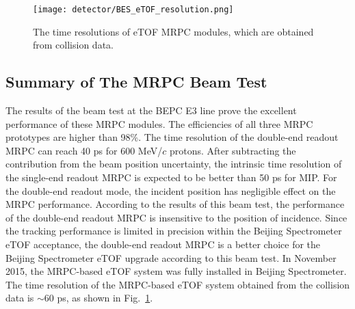 \begin{figure}[htbp]
\begin{center}
\texttt{[image: detector/BES\_eTOF\_resolution.png]}
\vspace*{-3mm}
\caption{The time resolutions of eTOF MRPC modules, which are obtained from collision data.} \label{eTOFRes}
\end{center}
\end{figure}

\subsection{Summary of The MRPC Beam Test}
The results of the beam test at the BEPC E3 line prove the excellent performance of these MRPC modules. The efficiencies of all three MRPC prototypes are higher than 98\%. The time resolution of the double-end readout MRPC can reach 40 ps for 600 MeV/$c$ protons. After subtracting the contribution from the beam position uncertainty, the intrinsic time resolution of the single-end readout MRPC is expected to be better than 50 ps for MIP. For the double-end readout mode, the incident position has negligible effect on the MRPC performance. According to the results of this beam test, the performance of the double-end readout MRPC is insensitive to the position of
incidence. Since the tracking performance is limited in precision within the Beijing Spectrometer eTOF acceptance, the double-end readout MRPC is a better choice for the Beijing Spectrometer eTOF upgrade according to this beam test. In November 2015, the MRPC-based eTOF system was fully installed in Beijing Spectrometer. The time resolution of the MRPC-based eTOF system obtained from the collision data is $\sim$60 ps, as shown in Fig.~\ref{eTOFRes}.


